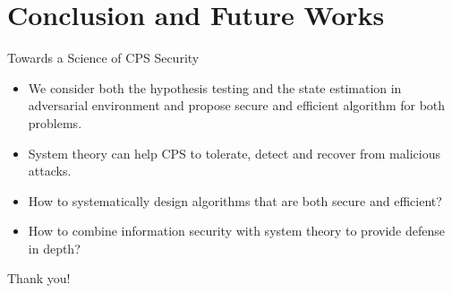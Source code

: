 \documentclass[10pt]{beamer}
\begin{document}
\section{Conclusion and Future Works}

\begin{frame}{Towards a Science of CPS Security}
  \begin{itemize}
  \item We consider both the hypothesis testing and the state estimation in adversarial environment and propose secure and efficient algorithm for both problems.
  \item System theory can help CPS to tolerate, detect and recover from malicious attacks.
  \item How to systematically design algorithms that are both secure and efficient?
  \item How to combine information security with system theory to provide defense in depth?
  \end{itemize}
\end{frame}

\begin{frame}[standout]
  Thank you!
\end{frame}
\end{document}
